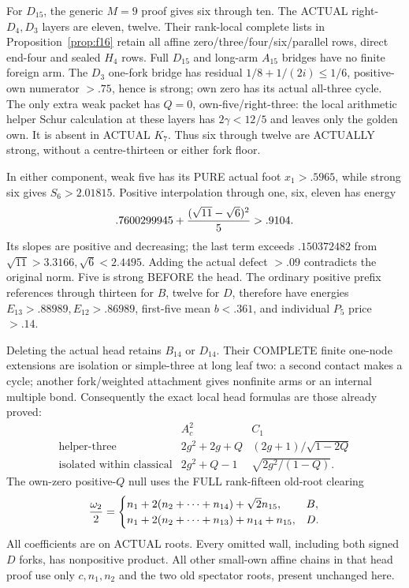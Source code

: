 For \(D_{15}\), the generic \(M=9\)
proof gives six through ten.
The ACTUAL right-\(D_4,D_3\) layers are
eleven, twelve.
Their rank-local complete lists in
Proposition~\ref{prop:f16} retain all affine
zero/three/four/six/parallel rows, direct
end-four and sealed \(H_4\) rows.
Full \(D_{15}\) and long-arm \(A_{15}\)
bridges have no finite foreign arm.
The \(D_3\) one-fork bridge has residual
\(1/8+1/(2i)\le1/6\), positive-own
numerator \(>.75\), hence is strong;
own zero has its actual all-three cycle.
The only extra weak packet has \(Q=0\),
own-five/right-three: the local arithmetic
helper Schur calculation at these layers
has \(2\gamma<12/5\) and leaves only
the golden own.
It is absent in ACTUAL \(K_7\).
Thus six through twelve are ACTUALLY
strong, without a centre-thirteen or
either fork floor.

In either component, weak five has its
PURE actual foot \(x_1>.5965\), while
strong six gives \(S_6>2.01815\).
Positive interpolation through one,
six, eleven has energy
\[
          .7600299945+{(\sqrt{11}-\sqrt6)^2\over5}>.9104 .
\]
Its slopes are positive and decreasing;
the last term exceeds \(.150372482\)
from \(\sqrt{11}>3.3166,\sqrt6<2.4495\).
Adding the actual defect \(>.09\)
contradicts the original norm.
Five is strong BEFORE the head.
The ordinary positive prefix references
through thirteen for \(B\), twelve for
\(D\), therefore have energies
\(E_{13}>.88989,E_{12}>.86989\), first-five
mean \(b<.361\), and individual
\(P_5\) price \(>.14\).

Deleting the actual head retains \(B_{14}\)
or \(D_{14}\).
Their COMPLETE finite one-node extensions
are isolation or simple-three at long
leaf two: a second contact makes a cycle;
another fork/weighted attachment gives
nonfinite arms or an internal multiple bond.
Consequently the exact local head formulas
are those already proved:
\[
 \begin{array}{c|c|c}
 &A_c^2&C_1\\ \hline
 \text{helper-three}&2g^2+2g+Q&(2g+1)/\sqrt{1-2Q}\\
 \text{isolated within classical}&2g^2+Q-1&
                                    \sqrt{2g^2/(1-Q)} .
 \end{array}
\]
The own-zero positive-\(Q\) null uses the
FULL rank-fifteen old-root clearing
\[
 {\omega_2\over2}=
 \begin{cases}
 n_1+2(n_2+\cdots+n_{14})+\sqrt2n_{15},&B,\\
 n_1+2(n_2+\cdots+n_{13})+n_{14}+n_{15},&D .
 \end{cases}
\]
All coefficients are on ACTUAL roots.
Every omitted wall, including both signed
\(D\) forks, has nonpositive product.
All other small-own affine chains in
that head proof use only \(c,n_1,n_2\)
and the two old spectator roots, present
unchanged here.

